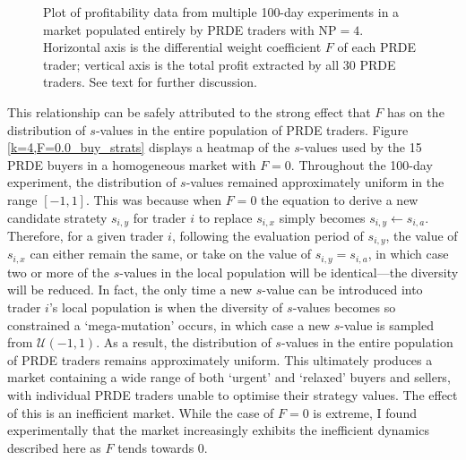 \documentclass[conference]{IEEEtran}
\begin{document}
\begin{figure}[htbp]
    \centering
    \caption{
        Plot of profitability data from multiple 100-day experiments in a market populated entirely by PRDE traders with $\mathrm{NP}=4$.
        Horizontal axis is the differential weight coefficient $F$ of each PRDE trader; vertical axis is the total profit extracted by all 30 PRDE traders.
        See text for further discussion.
    }
    \label{F_profit}
\end{figure}

This relationship can be safely attributed to the strong effect that $F$ has on the distribution of $s$-values in the entire population of PRDE traders.
Figure \ref{k=4,F=0.0_buy_strats} displays a heatmap of the $s$-values used by the 15 PRDE buyers in a homogeneous market with $F=0$.
Throughout the 100-day experiment, the distribution of $s$-values remained approximately uniform in the range $[-1, 1]$.
This was because when $F=0$ the equation to derive a new candidate stratety $s_{i,y}$ for trader $i$ to replace $s_{i,x}$ simply becomes $s_{i,y}\leftarrow s_{i,a}$.
Therefore, for a given trader $i$, following the evaluation period of $s_{i,y}$, the value of $s_{i,x}$ can either remain the same, or take on the value of $s_{i,y}=s_{i,a}$, in which case two or more of the $s$-values in the local population will be identical---the diversity will be reduced.
In fact, the only time a new $s$-value can be introduced into trader $i$'s local population is when the diversity of $s$-values becomes so constrained a `mega-mutation' occurs, in which case a new $s$-value is sampled from $\mathcal{U}(-1,1)$.
As a result, the distribution of $s$-values in the entire population of PRDE traders remains approximately uniform.
This ultimately produces a market containing a wide range of both `urgent' and `relaxed' buyers and sellers, with individual PRDE traders unable to optimise their strategy values.
The effect of this is an inefficient market.
While the case of $F=0$ is extreme, I found experimentally that the market increasingly exhibits the inefficient dynamics described here as $F$ tends towards $0$.
\end{document}
